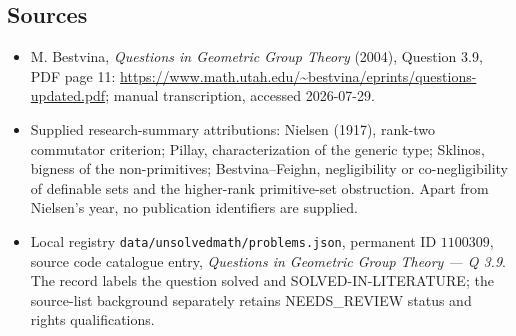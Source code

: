 \documentclass[11pt]{article}
\begin{document}
\subsection{Sources}
\begin{itemize}
\item M. Bestvina, \emph{Questions in Geometric Group Theory} (2004), Question 3.9, PDF page 11: \url{https://www.math.utah.edu/~bestvina/eprints/questions-updated.pdf}; manual transcription, accessed 2026-07-29.
\item Supplied research-summary attributions: Nielsen (1917), rank-two commutator criterion; Pillay, characterization of the generic type; Sklinos, bigness of the non-primitives; Bestvina--Feighn, negligibility or co-negligibility of definable sets and the higher-rank primitive-set obstruction. Apart from Nielsen's year, no publication identifiers are supplied.
\item Local registry \texttt{data/unsolvedmath/problems.json}, permanent ID $1100309$, source code catalogue entry, \emph{Questions in Geometric Group Theory --- Q 3.9}. The record labels the question solved and SOLVED-IN-LITERATURE; the source-list background separately retains NEEDS\_REVIEW status and rights qualifications.
\end{itemize}
\end{document}
